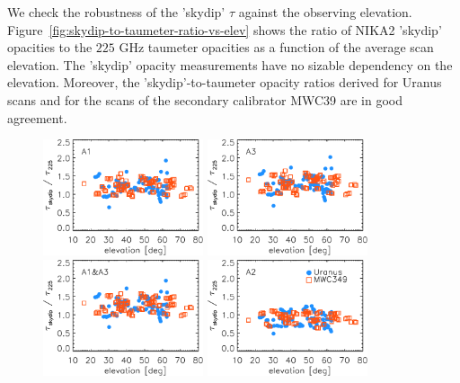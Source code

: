 We check the robustness of the 'skydip' $\tau$ against the
observing elevation. 
Figure~\ref{fig:skydip-to-taumeter-ratio-vs-elev} shows the ratio of NIKA2
'skydip' opacities to the $225$ GHz taumeter opacities as a function of
the average scan elevation. The 'skydip' opacity measurements have no
sizable dependency on the elevation. Moreover, the
'skydip'-to-taumeter opacity ratios derived for Uranus scans and for
the scans of the secondary calibrator MWC39 are in good agreement.

\begin{figure}[ht!]
  \begin{center}
    \includegraphics[clip=true, trim={0, -0.3cm, -0.3cm, 0}, width=0.42\textwidth]{Figures/Opacity/Opacity_skydip_to_taumeter_vs_elev_a1.pdf}
    \includegraphics[clip=true, trim={0, -0.3cm, -0.3cm, 0}, width=0.42\textwidth]{Figures/Opacity/Opacity_skydip_to_taumeter_vs_elev_a3.pdf}
    \includegraphics[clip=true, trim={0, -0.3cm, -0.3cm, 0}, width=0.42\textwidth]{Figures/Opacity/Opacity_skydip_to_taumeter_vs_elev_1mm.pdf}
    \includegraphics[clip=true, trim={0, -0.3cm, -0.3cm, 0}, width=0.42\textwidth]{Figures/Opacity/Opacity_skydip_to_taumeter_vs_elev_a2.pdf}

\end{center}
\end{figure}
